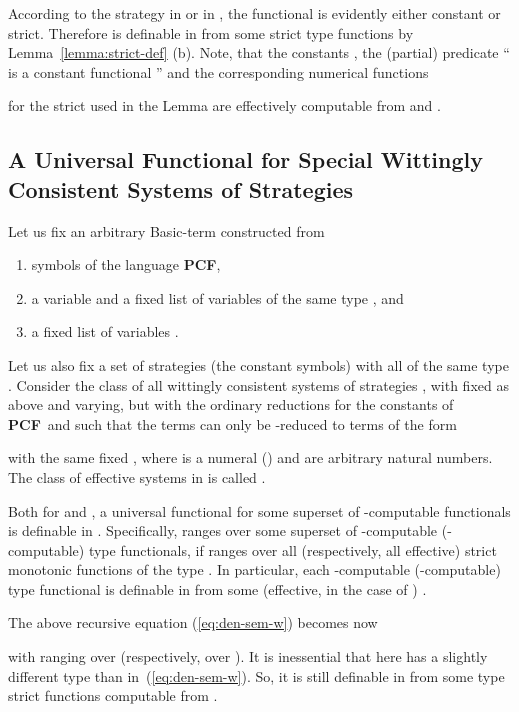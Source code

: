 \documentclass[fleqn]{LMCS}
\theoremstyle{plain}\newtheorem{satz}[thm]{Satz}
\theoremstyle{plain}\newtheorem{hyp}[thm]{Hypothesis}
\theoremstyle{plain}\newtheorem{hyps}[thm]{Hypotheses}
\theoremstyle{definition}\newtheorem{note}[thm]{Note}
\newcommand{\PCF}{\mbox{\bf PCF}}
\newcommand{\?}{\mbox{?}}
\begin{document}
According to the strategy  in  or  in 
, the functional  is 
evidently either constant  or strict. 
Therefore  is definable 
in  from some strict type  functions 
by Lemma~\ref{lemma:strict-def} (b). 
Note, that the constants , the (partial) predicate  
`` is a constant functional '' 
and the corresponding numerical functions  

for the strict  
used in the Lemma are effectively computable from  and . 






\subsection{A Universal Functional for Special Wittingly Consistent 
Systems of Strategies}
\label{sec:univ-special}

\noindent
Let us fix an arbitrary Basic-term  
constructed from 
\begin{enumerate}[]
\item 
symbols of the language \PCF,  
\item
a variable  and a fixed list of variables
 of the same type 
, and 
\item
a fixed list of variables 
. 
\end{enumerate}
Let us also fix a set  
of strategies (the constant symbols) with all  of the same type . 
Consider the class  of all wittingly consistent systems of strategies 
, with  fixed as above  
and  varying, but with the ordinary reductions for the 
constants of \PCF\ and such that the terms  
can only be -reduced to terms of the form 

with the same fixed , 
where  is a numeral () and  
are arbitrary  natural numbers. 
The class of effective systems in  is called 
.
\begin{lem}
\label{lemma:KA-universal}
Both for  and , 
a universal functional 
\mbox{} 
for some superset of -computable functionals is definable in . 
Specifically,  ranges over some superset of -computable 
(-computable) type  functionals, 
if  ranges over all (respectively, all effective) strict monotonic 
functions of the type 
. 
In particular, each -computable 
(-computable) type  functional 
is definable in  from some (effective, in the case of ) 
. 
\end{lem}
\proof 
The above recursive equation (\ref{eq:den-sem-w}) becomes now 

with  ranging over  (respectively, over ).
It is inessential that  here has a slightly different 
type than in~(\ref{eq:den-sem-w}). 
So, it is still definable in  from some type  strict 
functions computable from . 
\end{document}
